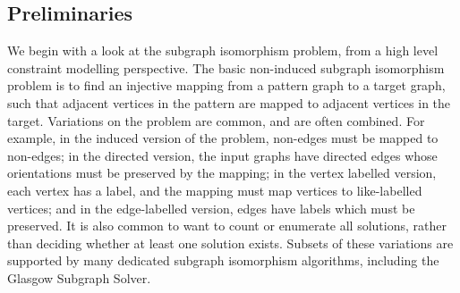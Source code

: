 \documentclass[runningheads]{llncs}
\begin{document}
\subsection{Preliminaries}

We begin with a look at the subgraph isomorphism problem, from a high level constraint modelling
perspective.  The basic non-induced subgraph isomorphism problem is to find an injective mapping
from a pattern graph to a target graph, such that adjacent vertices in the pattern are mapped to
adjacent vertices in the target. Variations on the problem are common, and are often combined. For
example, in the induced version of the problem, non-edges must be mapped to non-edges; in the
directed version, the input graphs have directed edges whose orientations must be preserved by the
mapping; in the vertex labelled version, each vertex has a label, and the mapping must map vertices
to like-labelled vertices; and in the edge-labelled version, edges have labels which must be
preserved.  It is also common to want to count or enumerate all solutions, rather than deciding
whether at least one solution exists.  Subsets of these variations are supported by many
dedicated subgraph isomorphism algorithms, including the Glasgow Subgraph Solver.
\end{document}
